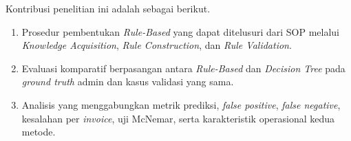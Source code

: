 Kontribusi penelitian ini adalah sebagai berikut.

\begin{enumerate}
    \item Prosedur pembentukan \textit{Rule-Based} yang dapat ditelusuri dari SOP melalui \textit{Knowledge Acquisition}, \textit{Rule Construction}, dan \textit{Rule Validation}.
    \item Evaluasi komparatif berpasangan antara \textit{Rule-Based} dan \textit{Decision Tree} pada \textit{ground truth} admin dan kasus validasi yang sama.
    \item Analisis yang menggabungkan metrik prediksi, \textit{false positive}, \textit{false negative}, kesalahan per \textit{invoice}, uji McNemar, serta karakteristik operasional kedua metode.
\end{enumerate}
